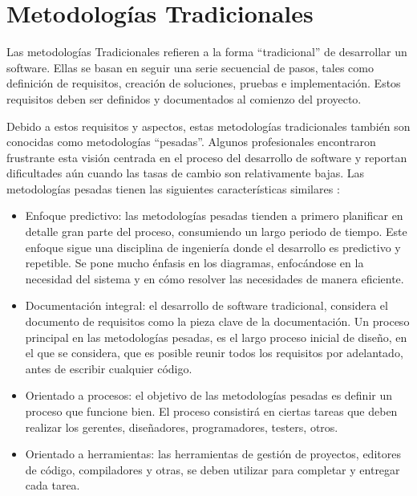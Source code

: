 \section{Metodologías Tradicionales}
\par Las metodologías Tradicionales refieren a la forma ``tradicional'' de desarrollar un software. Ellas se basan en seguir una serie secuencial de pasos, tales como definición de requisitos, creación de soluciones, pruebas e implementación. Estos requisitos deben ser definidos y documentados al comienzo del proyecto.\\
\par  Debido a estos requisitos y aspectos, estas metodologías tradicionales también son conocidas como metodologías ``pesadas''. Algunos profesionales encontraron frustrante esta visión centrada en el proceso del desarrollo de software y reportan dificultades aún cuando las tasas de cambio son relativamente bajas. Las metodologías pesadas tienen las siguientes características similares \cite{BOOK08}:
\begin{itemize}
    \item Enfoque predictivo: las metodologías pesadas tienden a primero planificar en detalle gran parte del proceso, consumiendo un largo periodo de tiempo. Este enfoque sigue una disciplina de ingeniería donde el desarrollo es predictivo y repetible. Se pone mucho énfasis en los diagramas, enfocándose en la necesidad del sistema y en cómo resolver las necesidades de manera eficiente.
    \item Documentación integral: el desarrollo de software tradicional, considera el documento de requisitos como la pieza clave de la documentación. Un proceso principal en las metodologías pesadas, es el largo proceso inicial de diseño, en el que se considera, que es posible reunir todos los requisitos por adelantado, antes de escribir cualquier código.
    \item Orientado a procesos: el objetivo de las metodologías pesadas es definir un proceso que funcione bien. El proceso consistirá en ciertas tareas que deben realizar los gerentes, diseñadores, programadores, testers, otros.
    \item Orientado a herramientas: las herramientas de gestión de proyectos, editores de código, compiladores y otras, se deben utilizar para completar y entregar cada tarea.
\end{itemize}

